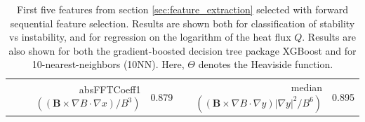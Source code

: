 \documentclass{jpp}
\begin{document}
\begin{table}
\begin{center}
\begin{tabular}{rcrc}
       absFFTCoeff1$((\mathbf{B}\times\nabla B\cdot\nabla x) / B^3)$ & 0.879 &
       median$((\mathbf{B}\times\nabla B\cdot\nabla y) |\nabla y|^2 / B^6)$ & 0.895 \\
  \end{tabular}
  \caption{
  First five features from section \ref{sec:feature_extraction} selected with forward sequential feature selection. 
  Results are shown both for classification of stability vs instability, and for regression on the logarithm of the heat flux $Q$.
  Results are also shown for both the gradient-boosted decision tree package XGBoost and for 10-nearest-neighbors (10NN).
  Here, $\Theta$ denotes the Heaviside function.
  }
  \label{tab:sfs}
  \end{center}
\end{table}




\end{document}
